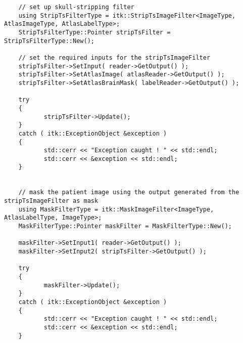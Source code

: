 \documentclass{InsightArticle}
\begin{document}
\small
\begin{verbatim}
	// set up skull-stripping filter
	using StripTsFilterType = itk::StripTsImageFilter<ImageType, AtlasImageType, AtlasLabelType>;
	StripTsFilterType::Pointer stripTsFilter = StripTsFilterType::New();

	// set the required inputs for the stripTsImageFilter
	stripTsFilter->SetInput( reader->GetOutput() );
	stripTsFilter->SetAtlasImage( atlasReader->GetOutput() );
	stripTsFilter->SetAtlasBrainMask( labelReader->GetOutput() );

	try
	{
		   stripTsFilter->Update();
	}
	catch ( itk::ExceptionObject &exception )
	{
		   std::cerr << "Exception caught ! " << std::endl;
		   std::cerr << &exception << std::endl;
	}


	// mask the patient image using the output generated from the stripTsImageFilter as mask
	using MaskFilterType = itk::MaskImageFilter<ImageType, AtlasLabelType, ImageType>;
	MaskFilterType::Pointer maskFilter = MaskFilterType::New();

	maskFilter->SetInput1( reader->GetOutput() );
	maskFilter->SetInput2( stripTsFilter->GetOutput() );

	try
	{
		   maskFilter->Update();
	}
	catch ( itk::ExceptionObject &exception )
	{
		   std::cerr << "Exception caught ! " << std::endl;
		   std::cerr << &exception << std::endl;
	}
\end{verbatim}
\normalsize

\newpage


%
%



\end{document}
